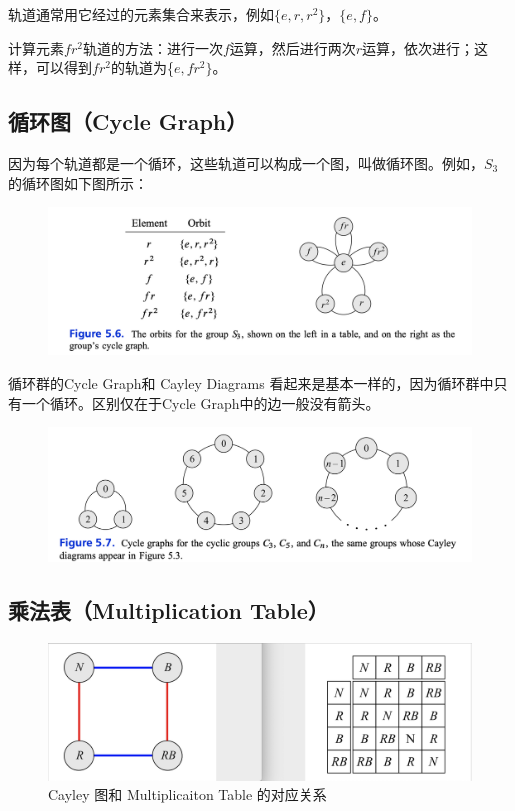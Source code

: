 \documentclass[12pt]{article}
\begin{document}
轨道通常用它经过的元素集合来表示，例如$\{e, r, r^2\}$，$\{e, f\}$。

计算元素$fr^2$轨道的方法：进行一次$f$运算，然后进行两次$r$运算，依次进行；这样，可以得到$fr^2$的轨道为\{$e, fr^2\}$。

\subsection{循环图（Cycle Graph）}
因为每个轨道都是一个循环，这些轨道可以构成一个图，叫做循环图。例如，$S_3$的循环图如下图所示：
\begin{figure}[H]
    \centering
    \includegraphics[width=.8\textwidth]{fig/Group/CycleGraph-S3.png}
\end{figure}

循环群的Cycle Graph和 Cayley Diagrams 看起来是基本一样的，因为循环群中只有一个循环。区别仅在于Cycle Graph中的边一般没有箭头。
\begin{figure}[H]
    \centering
    \includegraphics[width=.8\textwidth]{fig/Group/CycleGraph-CyclicGroup.png}
\end{figure}

\subsection{乘法表（Multiplication Table）}
\begin{figure}[H]
    \centering
    \includegraphics[width=.7\textwidth]{fig/Group/MultiplicationTable_Klein4.png}
     \caption{Cayley 图和 Multiplicaiton Table 的对应关系}
\end{figure}
\end{document}
